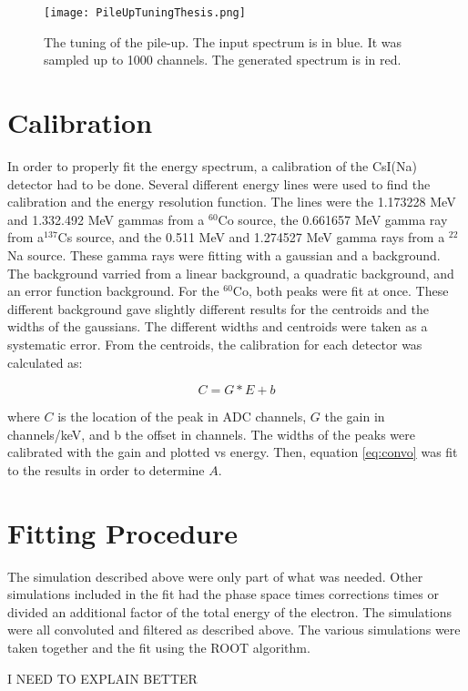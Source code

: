 \begin{figure}[!htb]
	\centerline{\texttt{[image: PileUpTuningThesis.png]}}
	\caption{The tuning of the pile-up.
		 The input spectrum is in blue.
		 It was sampled up to 1000 channels.
		 The generated spectrum is in red.}
	\label{fig:pileuptune}
\end{figure}

\section{Calibration}
In order to properly fit the energy spectrum, a calibration of the CsI(Na) detector had to be done.
Several different energy lines were used to find the calibration and the energy resolution function.
The lines were the 1.173228 MeV and 1.332.492 MeV gammas from a $^{60}$Co source, the 0.661657 MeV gamma ray from a$^{137}$Cs source, and the 0.511 MeV and 1.274527 MeV gamma rays from a $^{22}$Na source.
These gamma rays were fitting with a gaussian and a background.
The background varried from a linear background, a quadratic background, and an error function background.
For the $^{60}$Co, both peaks were fit at once.
These different background gave slightly different results for the centroids and the widths of the gaussians.
The different widths and centroids were taken as a systematic error.
From the centroids, the calibration for each detector was calculated as:

\begin{equation}
	C = G * E + b
	\label{eq:convo}
\end{equation}

where $C$ is the location of the peak in ADC channels, $G$ the gain in channels/keV, and b the offset in channels.
The widths of the peaks were calibrated with the gain and plotted vs energy.
Then, equation \ref{eq:convo} was fit to the results in order to determine $A$.

\section{Fitting Procedure}
The simulation described above were only part of what was needed.
Other simulations included in the fit had the phase space times corrections times or divided an additional factor of the total energy of the electron.
The simulations were all convoluted and filtered as described above.
The various simulations were taken together and the fit using the ROOT algorithm.

I NEED TO EXPLAIN BETTER
